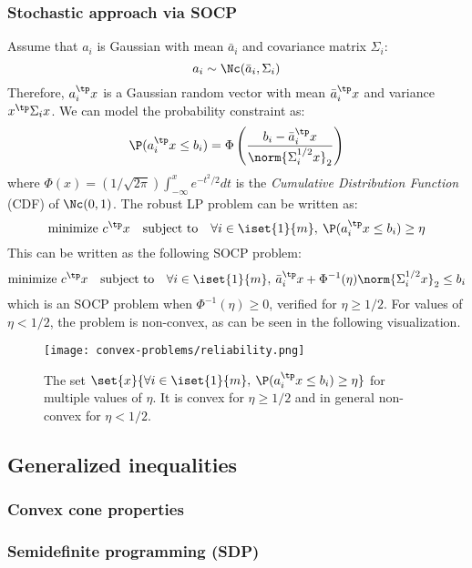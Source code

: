 \subsubsection{Stochastic approach via SOCP}
Assume that $a_i$ is Gaussian with mean $\bar{a}_i$ and covariance matrix $\Sigma_i$:
\begin{equation*}
    a_i\sim\Nc(\bar{a}_i, \Sigma_i)
\end{equation*}
Therefore, $a_i^\tp x$ is a Gaussian random vector with mean $\bar{a}_i^\tp x$ and variance $x^\tp\Sigma_i x$. We can model the probability constraint as:
\begin{equation*}
    \P(a_i^\tp x\leq b_i)=\Phi\left(\frac{b_i-\bar{a}_i^\tp x}{\norm{\Sigma_i^{1/2}x}_2}\right)
\end{equation*}
where $\Phi(x)=(1/\sqrt{2\pi})\int_{-\infty}^x e^{-t^2/2}dt$ is the \emph{Cumulative Distribution Function} (CDF) of $\Nc(0,1)$. The robust LP problem can be written as:
\begin{equation*}
    \text{minimize } c^\tp x \quad\text{subject to}\quad \forall i\in\iset{1}{m}, \: \P(a_i^\tp x\leq b_i)\geq\eta
\end{equation*}
This can be written as the following SOCP problem:
\begin{equation*}
    \text{minimize } c^\tp x \quad\text{subject to}\quad \forall i\in\iset{1}{m}, \: \bar{a}_i^\tp x+\Phi^{-1}(\eta)\norm{\Sigma_i^{1/2}x}_2\leq b_i
\end{equation*}
which is an SOCP problem when $\Phi^{-1}(\eta)\geq0$, verified for $\eta\geq1/2$. For values of $\eta<1/2$, the problem is non-convex, as can be seen in the following visualization.
\begin{figure}[H]
    \centering
    \texttt{[image: convex-problems/reliability.png]}
    \caption{The set $\set{x}{\forall i\in\iset{1}{m}, \: \P(a_i^\tp x\leq b_i)\geq\eta}$ for multiple values of $\eta$. It is convex for $\eta\geq1/2$ and in general non-convex for $\eta<1/2$.}
\end{figure}

\subsection{Generalized inequalities}
\subsubsection{Convex cone properties}
\subsubsection{Semidefinite programming (SDP)}

